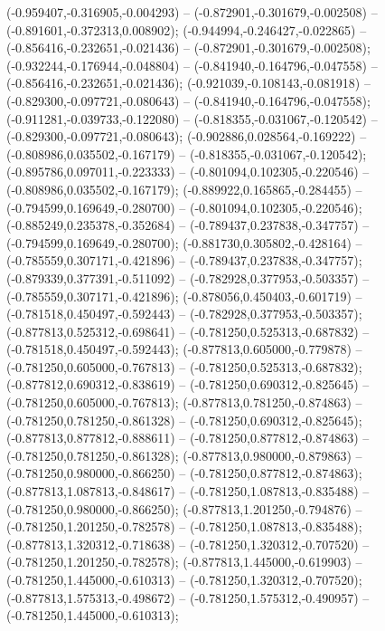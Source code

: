  (-0.959407,-0.316905,-0.004293) -- (-0.872901,-0.301679,-0.002508) -- (-0.891601,-0.372313,0.008902);
 (-0.944994,-0.246427,-0.022865) -- (-0.856416,-0.232651,-0.021436) -- (-0.872901,-0.301679,-0.002508);
 (-0.932244,-0.176944,-0.048804) -- (-0.841940,-0.164796,-0.047558) -- (-0.856416,-0.232651,-0.021436);
 (-0.921039,-0.108143,-0.081918) -- (-0.829300,-0.097721,-0.080643) -- (-0.841940,-0.164796,-0.047558);
 (-0.911281,-0.039733,-0.122080) -- (-0.818355,-0.031067,-0.120542) -- (-0.829300,-0.097721,-0.080643);
 (-0.902886,0.028564,-0.169222) -- (-0.808986,0.035502,-0.167179) -- (-0.818355,-0.031067,-0.120542);
 (-0.895786,0.097011,-0.223333) -- (-0.801094,0.102305,-0.220546) -- (-0.808986,0.035502,-0.167179);
 (-0.889922,0.165865,-0.284455) -- (-0.794599,0.169649,-0.280700) -- (-0.801094,0.102305,-0.220546);
 (-0.885249,0.235378,-0.352684) -- (-0.789437,0.237838,-0.347757) -- (-0.794599,0.169649,-0.280700);
 (-0.881730,0.305802,-0.428164) -- (-0.785559,0.307171,-0.421896) -- (-0.789437,0.237838,-0.347757);
 (-0.879339,0.377391,-0.511092) -- (-0.782928,0.377953,-0.503357) -- (-0.785559,0.307171,-0.421896);
 (-0.878056,0.450403,-0.601719) -- (-0.781518,0.450497,-0.592443) -- (-0.782928,0.377953,-0.503357);
 (-0.877813,0.525312,-0.698641) -- (-0.781250,0.525313,-0.687832) -- (-0.781518,0.450497,-0.592443);
 (-0.877813,0.605000,-0.779878) -- (-0.781250,0.605000,-0.767813) -- (-0.781250,0.525313,-0.687832);
 (-0.877812,0.690312,-0.838619) -- (-0.781250,0.690312,-0.825645) -- (-0.781250,0.605000,-0.767813);
 (-0.877813,0.781250,-0.874863) -- (-0.781250,0.781250,-0.861328) -- (-0.781250,0.690312,-0.825645);
 (-0.877813,0.877812,-0.888611) -- (-0.781250,0.877812,-0.874863) -- (-0.781250,0.781250,-0.861328);
 (-0.877813,0.980000,-0.879863) -- (-0.781250,0.980000,-0.866250) -- (-0.781250,0.877812,-0.874863);
 (-0.877813,1.087813,-0.848617) -- (-0.781250,1.087813,-0.835488) -- (-0.781250,0.980000,-0.866250);
 (-0.877813,1.201250,-0.794876) -- (-0.781250,1.201250,-0.782578) -- (-0.781250,1.087813,-0.835488);
 (-0.877813,1.320312,-0.718638) -- (-0.781250,1.320312,-0.707520) -- (-0.781250,1.201250,-0.782578);
 (-0.877813,1.445000,-0.619903) -- (-0.781250,1.445000,-0.610313) -- (-0.781250,1.320312,-0.707520);
 (-0.877813,1.575313,-0.498672) -- (-0.781250,1.575312,-0.490957) -- (-0.781250,1.445000,-0.610313);
